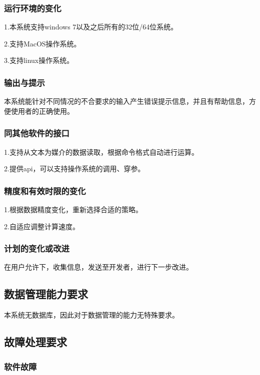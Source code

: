\subsubsection{运行环境的变化}

1.本系统支持windows 7以及之后所有的32位/64位系统。

2.支持MacOS操作系统。

3.支持linux操作系统。

\subsubsection{输出与提示}

本系统能针对不同情况的不合要求的输入产生错误提示信息，并且有帮助信息，方便使用者的正确使用。

\subsubsection{同其他软件的接口}

1.支持从文本为媒介的数据读取，根据命令格式自动进行运算。

2.提供api，可以支持操作系统的调用、穿参。

\subsubsection{精度和有效时限的变化}

1.根据数据精度变化，重新选择合适的策略。

2.自适应调整计算速度。

\subsubsection{计划的变化或改进}

在用户允许下，收集信息，发送至开发者，进行下一步改进。

\subsection{数据管理能力要求}

本系统无数据库，因此对于数据管理的能力无特殊要求。

\subsection{故障处理要求}


\subsubsection{软件故障}

